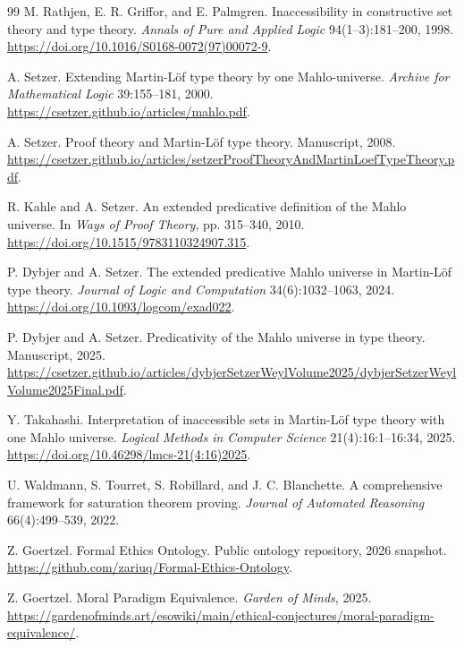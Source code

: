 \documentclass[11pt]{article}
\theoremstyle{definition}
\theoremstyle{remark}
\begin{document}
\begin{thebibliography}{99}
M. Rathjen, E. R. Griffor, and E. Palmgren.
\newblock Inaccessibility in constructive set theory and type theory.
\newblock \emph{Annals of Pure and Applied Logic} 94(1--3):181--200, 1998.
\newblock \url{https://doi.org/10.1016/S0168-0072(97)00072-9}.

A. Setzer.
\newblock Extending Martin-L\"of type theory by one Mahlo-universe.
\newblock \emph{Archive for Mathematical Logic} 39:155--181, 2000.
\newblock \url{https://csetzer.github.io/articles/mahlo.pdf}.

A. Setzer.
\newblock Proof theory and Martin-L\"of type theory.
\newblock Manuscript, 2008.
\newblock \url{https://csetzer.github.io/articles/setzerProofTheoryAndMartinLoefTypeTheory.pdf}.

R. Kahle and A. Setzer.
\newblock An extended predicative definition of the Mahlo universe.
\newblock In \emph{Ways of Proof Theory}, pp. 315--340, 2010.
\newblock \url{https://doi.org/10.1515/9783110324907.315}.

P. Dybjer and A. Setzer.
\newblock The extended predicative Mahlo universe in Martin-L\"of type theory.
\newblock \emph{Journal of Logic and Computation} 34(6):1032--1063, 2024.
\newblock \url{https://doi.org/10.1093/logcom/exad022}.

P. Dybjer and A. Setzer.
\newblock Predicativity of the Mahlo universe in type theory.
\newblock Manuscript, 2025.
\newblock \url{https://csetzer.github.io/articles/dybjerSetzerWeylVolume2025/dybjerSetzerWeylVolume2025Final.pdf}.

Y. Takahashi.
\newblock Interpretation of inaccessible sets in Martin-L\"of type theory with
  one Mahlo universe.
\newblock \emph{Logical Methods in Computer Science} 21(4):16:1--16:34, 2025.
\newblock \url{https://doi.org/10.46298/lmcs-21(4:16)2025}.

U. Waldmann, S. Tourret, S. Robillard, and J. C. Blanchette.
\newblock A comprehensive framework for saturation theorem proving.
\newblock \emph{Journal of Automated Reasoning} 66(4):499--539, 2022.

Z. Goertzel.
\newblock Formal Ethics Ontology.
\newblock Public ontology repository, 2026 snapshot.
\newblock \url{https://github.com/zariuq/Formal-Ethics-Ontology}.

Z. Goertzel.
\newblock Moral Paradigm Equivalence.
\newblock \emph{Garden of Minds}, 2025.
\newblock \url{https://gardenofminds.art/esowiki/main/ethical-conjectures/moral-paradigm-equivalence/}.


\end{thebibliography}
\end{document}
